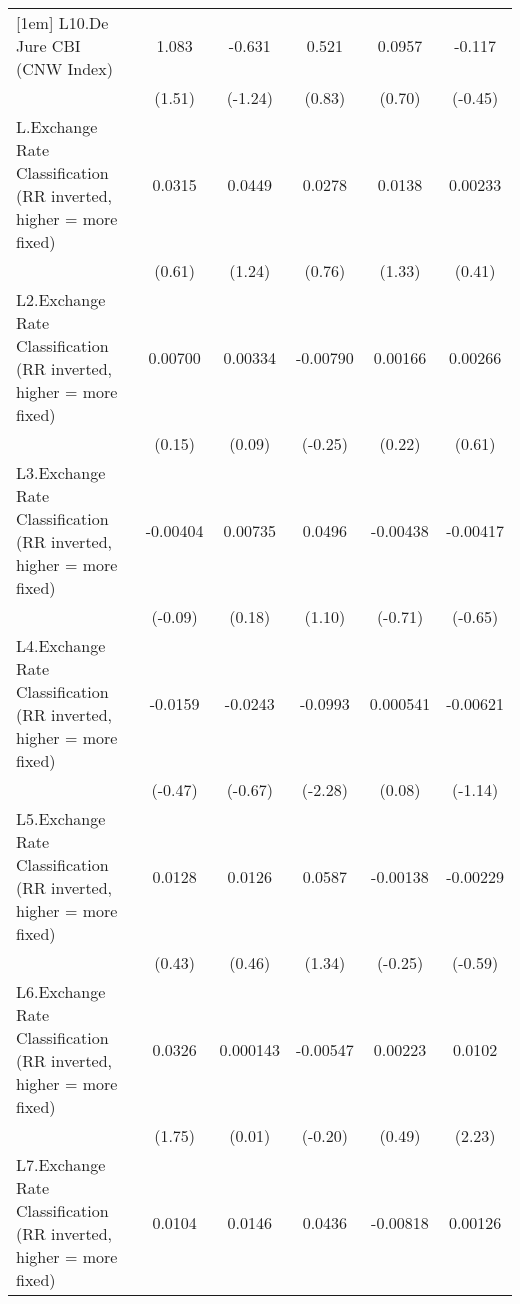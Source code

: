 {\begin{longtable}{l*{5}{c}}
[1em]
L10.De Jure CBI (CNW Index)&    1.083         &   -0.631         &    0.521         &   0.0957         &   -0.117         \\
                &   (1.51)         &  (-1.24)         &   (0.83)         &   (0.70)         &  (-0.45)         \\
[1em]
L.Exchange Rate Classification (RR inverted, higher = more fixed)&   0.0315         &   0.0449         &   0.0278         &   0.0138         &  0.00233         \\
                &   (0.61)         &   (1.24)         &   (0.76)         &   (1.33)         &   (0.41)         \\
[1em]
L2.Exchange Rate Classification (RR inverted, higher = more fixed)&  0.00700         &  0.00334         & -0.00790         &  0.00166         &  0.00266         \\
                &   (0.15)         &   (0.09)         &  (-0.25)         &   (0.22)         &   (0.61)         \\
[1em]
L3.Exchange Rate Classification (RR inverted, higher = more fixed)& -0.00404         &  0.00735         &   0.0496         & -0.00438         & -0.00417         \\
                &  (-0.09)         &   (0.18)         &   (1.10)         &  (-0.71)         &  (-0.65)         \\
[1em]
L4.Exchange Rate Classification (RR inverted, higher = more fixed)&  -0.0159         &  -0.0243         &  -0.0993\sym{*}  & 0.000541         & -0.00621         \\
                &  (-0.47)         &  (-0.67)         &  (-2.28)         &   (0.08)         &  (-1.14)         \\
[1em]
L5.Exchange Rate Classification (RR inverted, higher = more fixed)&   0.0128         &   0.0126         &   0.0587         & -0.00138         & -0.00229         \\
                &   (0.43)         &   (0.46)         &   (1.34)         &  (-0.25)         &  (-0.59)         \\
[1em]
L6.Exchange Rate Classification (RR inverted, higher = more fixed)&   0.0326         & 0.000143         & -0.00547         &  0.00223         &   0.0102\sym{*}  \\
                &   (1.75)         &   (0.01)         &  (-0.20)         &   (0.49)         &   (2.23)         \\
[1em]
L7.Exchange Rate Classification (RR inverted, higher = more fixed)&   0.0104         &   0.0146         &   0.0436\sym{*}  & -0.00818         &  0.00126         \\

\end{longtable}}
